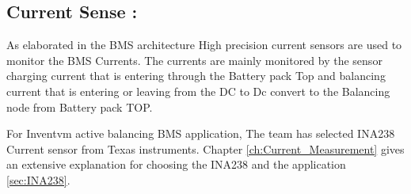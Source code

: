 \subsection{Current Sense :}

As elaborated in the BMS architecture High precision current sensors are used to monitor the BMS Currents. The currents are mainly monitored by the sensor charging current that is entering through the Battery pack Top and balancing current that is entering or leaving from the DC to Dc convert to the Balancing node from Battery pack TOP.

For Inventvm active balancing BMS application, The team has selected INA238 Current sensor from Texas instruments. Chapter \ref{ch:Current_Measurement} gives an extensive explanation for choosing the INA238\cite{INA238_User_Datasheet} and the application \ref{sec:INA238}.